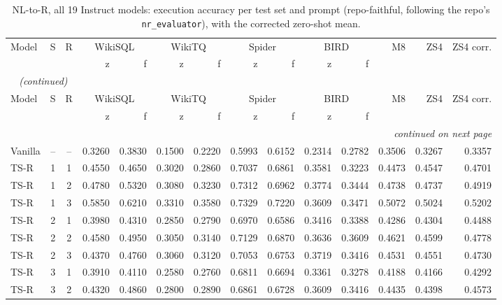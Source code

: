 {\footnotesize
{}
\setlength{\tabcolsep}{4.2pt}
\begin{longtable}{@{}lccrrrrrrrrrrr@{}}
\caption{NL-to-R, all 19 Instruct models: execution accuracy per test set and prompt (repo-faithful, following the repo's \texttt{nr\_evaluator}), with the corrected zero-shot mean.}\label{tab:gen-nlr}\\
\toprule
\rowcolor{headshade}Model & S & R & \multicolumn{2}{c}{WikiSQL} & \multicolumn{2}{c}{WikiTQ} & \multicolumn{2}{c}{Spider} & \multicolumn{2}{c}{BIRD} & M8 & ZS4 & ZS4 corr.\\\rowcolor{headshade} & & & z & f & z & f & z & f & z & f & & &\\
\midrule
\endfirsthead
\multicolumn{14}{l}{\textit{\tablename~\thetable{} (continued)}}\\
\toprule
\rowcolor{headshade}Model & S & R & \multicolumn{2}{c}{WikiSQL} & \multicolumn{2}{c}{WikiTQ} & \multicolumn{2}{c}{Spider} & \multicolumn{2}{c}{BIRD} & M8 & ZS4 & ZS4 corr.\\\rowcolor{headshade} & & & z & f & z & f & z & f & z & f & & &\\
\midrule
\endhead
\midrule
\multicolumn{14}{r}{\textit{continued on next page}}\\
\endfoot
\bottomrule
\endlastfoot
Vanilla & -- & -- & 0.3260 & 0.3830 & 0.1500 & 0.2220 & 0.5993 & 0.6152 & 0.2314 & 0.2782 & 0.3506 & 0.3267 & 0.3357\\
\midrule
TS-R & 1 & 1 & 0.4550 & 0.4650 & 0.3020 & 0.2860 & 0.7037 & 0.6861 & 0.3581 & 0.3223 & 0.4473 & 0.4547 & 0.4701\\
TS-R & 1 & 2 & 0.4780 & 0.5320 & 0.3080 & 0.3230 & 0.7312 & 0.6962 & 0.3774 & 0.3444 & 0.4738 & 0.4737 & 0.4919\\
TS-R & 1 & 3 & 0.5850 & 0.6210 & 0.3310 & 0.3580 & 0.7329 & 0.7220 & 0.3609 & 0.3471 & 0.5072 & 0.5024 & 0.5202\\
TS-R & 2 & 1 & 0.3980 & 0.4310 & 0.2850 & 0.2790 & 0.6970 & 0.6586 & 0.3416 & 0.3388 & 0.4286 & 0.4304 & 0.4488\\
TS-R & 2 & 2 & 0.4580 & 0.4950 & 0.3050 & 0.3140 & 0.7129 & 0.6870 & 0.3636 & 0.3609 & 0.4621 & 0.4599 & 0.4778\\
TS-R & 2 & 3 & 0.4370 & 0.4760 & 0.3060 & 0.3120 & 0.7053 & 0.6753 & 0.3719 & 0.3416 & 0.4531 & 0.4551 & 0.4730\\
TS-R & 3 & 1 & 0.3910 & 0.4110 & 0.2580 & 0.2760 & 0.6811 & 0.6694 & 0.3361 & 0.3278 & 0.4188 & 0.4166 & 0.4292\\
TS-R & 3 & 2 & 0.4320 & 0.4860 & 0.2800 & 0.2890 & 0.6861 & 0.6728 & 0.3609 & 0.3416 & 0.4435 & 0.4398 & 0.4573\\

\end{longtable}}
